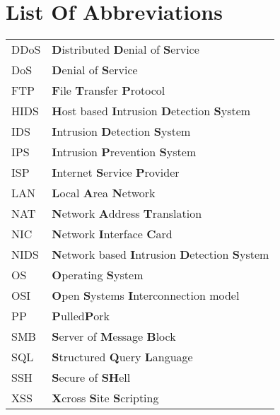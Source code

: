 \chapter*{List Of Abbreviations}
\begin{flushleft}
\renewcommand{\baselinestretch}{1.5}
\small\normalsize
\begin{longtable}{ll}
DDoS & \textbf{D}istributed \textbf{D}enial of \textbf{S}ervice\\
DoS & \textbf{D}enial of \textbf{S}ervice\\
FTP & \textbf{F}ile \textbf{T}ransfer \textbf{P}rotocol\\
HIDS & \textbf{H}ost based \textbf{I}ntrusion \textbf{D}etection \textbf{S}ystem\\
IDS & \textbf{I}ntrusion \textbf{D}etection \textbf{S}ystem\\
IPS & \textbf{I}ntrusion \textbf{P}revention \textbf{S}ystem\\
ISP & \textbf{I}nternet \textbf{S}ervice \textbf{P}rovider\\
LAN & \textbf{L}ocal \textbf{A}rea \textbf{N}etwork\\
NAT & \textbf{N}etwork \textbf{A}ddress \textbf{T}ranslation\\
NIC & \textbf{N}etwork \textbf{I}nterface \textbf{C}ard\\
NIDS & \textbf{N}etwork based \textbf{I}ntrusion \textbf{D}etection \textbf{S}ystem\\
OS & \textbf{O}perating \textbf{S}ystem\\
OSI & \textbf{O}pen \textbf{S}ystems \textbf{I}nterconnection model\\
PP & \textbf{P}ulled\textbf{P}ork\\
SMB & \textbf{S}erver of \textbf{M}essage \textbf{B}lock\\
SQL & \textbf{S}tructured \textbf{Q}uery \textbf{L}anguage\\
SSH & \textbf{S}ecure of \textbf{SH}ell \\
XSS & \textbf{X}cross \textbf{S}ite \textbf{S}cripting\\
\end{longtable}
\end{flushleft}
